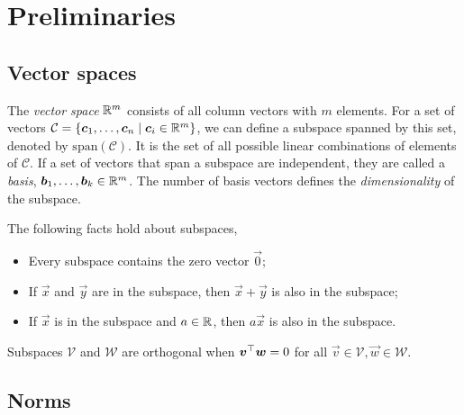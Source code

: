 \section{Preliminaries}

\subsection{Vector spaces}

The \textit{vector space} $\mathbb{R}^m$ consists of all column vectors with $m$ elements. For a set of
vectors $\mathcal{C} = \{ \bm{c}_1,\ldots,\bm{c}_n \mid \bm{c}_i \in \mathbb{R}^m \}$, we can define a
subspace spanned by this set, denoted by $\mathrm{span}(\mathcal{C})$. It is the set of all
possible linear combinations of elements of $\mathcal{C}$. If a set of vectors that span a subspace
are independent, they are called a \textit{basis}, $\bm{b}_1,\ldots,\bm{b}_k \in \mathbb{R}^m$. The
number of basis vectors defines the \textit{dimensionality} of the subspace.

\begin{observation}
    The following facts hold about subspaces,
    \begin{itemize}
        \item Every subspace contains the zero vector $\vec{0}$;
        \item If $\vec{x}$ and $\vec{y}$ are in the subspace, then $\vec{x}+\vec{y}$ is also in the subspace;
        \item If $\vec{x}$ is in the subspace and $a\in \mathbb{R}$, then $a\vec{x}$ is also in the subspace.
    \end{itemize}
\end{observation}

\begin{definition}
    Subspaces $\mathcal{V}$ and $\mathcal{W}$ are orthogonal when $\bm{v}^\top\bm{w} = 0$ for
    all $\vec{v}\in \mathcal{V}, \vec{w}\in \mathcal{W}$.
\end{definition}

\subsection{Norms}

